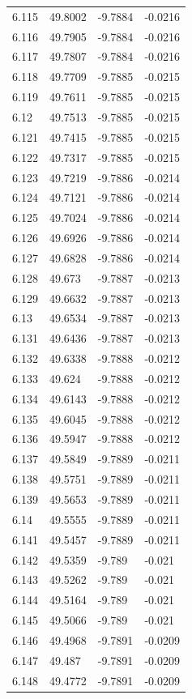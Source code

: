 \begin{tabular}{llll}
6.115 & 49.8002 & -9.7884 & -0.0216 \\
6.116 & 49.7905 & -9.7884 & -0.0216 \\
6.117 & 49.7807 & -9.7884 & -0.0216 \\
6.118 & 49.7709 & -9.7885 & -0.0215 \\
6.119 & 49.7611 & -9.7885 & -0.0215 \\
6.12 & 49.7513 & -9.7885 & -0.0215 \\
6.121 & 49.7415 & -9.7885 & -0.0215 \\
6.122 & 49.7317 & -9.7885 & -0.0215 \\
6.123 & 49.7219 & -9.7886 & -0.0214 \\
6.124 & 49.7121 & -9.7886 & -0.0214 \\
6.125 & 49.7024 & -9.7886 & -0.0214 \\
6.126 & 49.6926 & -9.7886 & -0.0214 \\
6.127 & 49.6828 & -9.7886 & -0.0214 \\
6.128 & 49.673 & -9.7887 & -0.0213 \\
6.129 & 49.6632 & -9.7887 & -0.0213 \\
6.13 & 49.6534 & -9.7887 & -0.0213 \\
6.131 & 49.6436 & -9.7887 & -0.0213 \\
6.132 & 49.6338 & -9.7888 & -0.0212 \\
6.133 & 49.624 & -9.7888 & -0.0212 \\
6.134 & 49.6143 & -9.7888 & -0.0212 \\
6.135 & 49.6045 & -9.7888 & -0.0212 \\
6.136 & 49.5947 & -9.7888 & -0.0212 \\
6.137 & 49.5849 & -9.7889 & -0.0211 \\
6.138 & 49.5751 & -9.7889 & -0.0211 \\
6.139 & 49.5653 & -9.7889 & -0.0211 \\
6.14 & 49.5555 & -9.7889 & -0.0211 \\
6.141 & 49.5457 & -9.7889 & -0.0211 \\
6.142 & 49.5359 & -9.789 & -0.021 \\
6.143 & 49.5262 & -9.789 & -0.021 \\
6.144 & 49.5164 & -9.789 & -0.021 \\
6.145 & 49.5066 & -9.789 & -0.021 \\
6.146 & 49.4968 & -9.7891 & -0.0209 \\
6.147 & 49.487 & -9.7891 & -0.0209 \\
6.148 & 49.4772 & -9.7891 & -0.0209 \\

\end{tabular}
